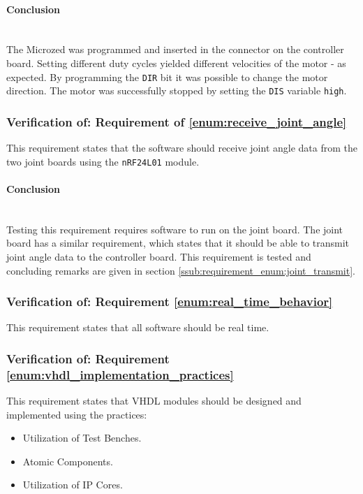 \paragraph{Conclusion}~\\
The Microzed was programmed and inserted in the connector on the controller board.
Setting different duty cycles yielded different velocities of the motor - as expected.
By programming the \texttt{DIR} bit it was possible to change the motor direction.
The motor was successfully stopped by setting the \texttt{DIS} variable \texttt{high}.

\subsubsection{Verification of: Requirement of \ref{enum:receive_joint_angle}} %
\label{ssub:verificatation_of_requirement_enum:receive_joint_angle}
This requirement states that the software should receive joint angle data from the two joint boards using the \texttt{nRF24L01} module.

\paragraph{Conclusion}~\\
Testing this requirement requires software to run on the joint board.
The joint board has a similar requirement, which states that it should be able to transmit joint angle data to the controller board.
This requirement is tested and concluding remarks are given in section \ref{ssub:requirement_enum:joint_transmit}.

\subsubsection{Verification of: Requirement \ref{enum:real_time_behavior}} %
\label{ssub:verification_of_requirement_of_requirement_enum:real_time_behavior}
This requirement states that all software should be real time.

\subsubsection{Verification of: Requirement \ref{enum:vhdl_implementation_practices}} %
\label{ssub:verification_of_requirement_enum:vhdl_implementation_practices}
This requirement states that VHDL modules should be designed and implemented using the practices:
\begin{itemize}
	\item Utilization of Test Benches.
	\item Atomic Components.
	\item Utilization of IP Cores.
\end{itemize}

